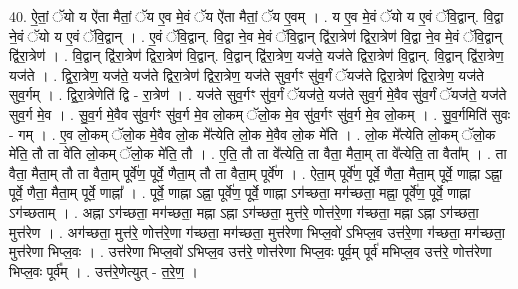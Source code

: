 \documentclass[17pt]{extarticle}
\begin{document}
40. ऐ॒तां॒ ॅयो य ऐ॑ता मैतां॒ ॅय ए॒व मे॒वं ॅय ऐ॑ता मैतां॒ ॅय ए॒वम् । . य ए॒व मे॒वं ॅयो य ए॒वं ॅवि॒द्वान्. वि॒द्वा ने॒वं ॅयो य ए॒वं ॅवि॒द्वान् । . ए॒वं ॅवि॒द्वान्. वि॒द्वा ने॒व मे॒वं ॅवि॒द्वान् द्वि॑रा॒त्रेण॑ द्विरा॒त्रेण॑ वि॒द्वा ने॒व मे॒वं ॅवि॒द्वान् द्वि॑रा॒त्रेण॑ । . वि॒द्वान् द्वि॑रा॒त्रेण॑ द्विरा॒त्रेण॑ वि॒द्वान्. वि॒द्वान् द्वि॑रा॒त्रेण॒ यज॑ते॒ यज॑ते द्विरा॒त्रेण॑ वि॒द्वान्. वि॒द्वान् द्वि॑रा॒त्रेण॒ यज॑ते । . द्वि॒रा॒त्रेण॒ यज॑ते॒ यज॑ते द्विरा॒त्रेण॑ द्विरा॒त्रेण॒ यज॑ते सुव॒र्गꣳ सु॑व॒र्गं ॅयज॑ते द्विरा॒त्रेण॑ द्विरा॒त्रेण॒ यज॑ते सुव॒र्गम् । . द्वि॒रा॒त्रेणेति॑ द्वि - रा॒त्रेण॑ । . यज॑ते सुव॒र्गꣳ सु॑व॒र्गं ॅयज॑ते॒ यज॑ते सुव॒र्ग मे॒वैव सु॑व॒र्गं ॅयज॑ते॒ यज॑ते सुव॒र्ग मे॒व । . सु॒व॒र्ग मे॒वैव सु॑व॒र्गꣳ सु॑व॒र्ग मे॒व लो॒कम् ॅलो॒क मे॒व सु॑व॒र्गꣳ सु॑व॒र्ग मे॒व लो॒कम् । . सु॒व॒र्गमिति॑ सुवः - गम् । . ए॒व लो॒कम् ॅलो॒क मे॒वैव लो॒क मे᳚त्येति लो॒क मे॒वैव लो॒क मे॑ति । . लो॒क मे᳚त्येति लो॒कम् ॅलो॒क मे॑ति॒ तौ ता वे॑ति लो॒कम् ॅलो॒क मे॑ति॒ तौ । . ए॒ति॒ तौ ता वे᳚त्येति॒ ता वैता॒ मैता॒म् ता वे᳚त्येति॒ ता वैता᳚म् । . ता वैता॒ मैता॒म् तौ ता वैता॒म् पूर्वे॑ण॒ पूर्वे॒ णैता॒म् तौ ता वैता॒म् पूर्वे॑ण । . ऐता॒म् पूर्वे॑ण॒ पूर्वे॒ णैता॒ मैता॒म् पूर्वे॒ णाह्ना ऽह्ना॒ पूर्वे॒ णैता॒ मैता॒म् पूर्वे॒ णाह्ना᳚ । . पूर्वे॒ णाह्ना ऽह्ना॒ पूर्वे॑ण॒ पूर्वे॒ णाह्ना ऽग॑च्छता॒ मग॑च्छता॒ मह्ना॒ पूर्वे॑ण॒ पूर्वे॒ णाह्ना ऽग॑च्छताम् । . अह्ना ऽग॑च्छता॒ मग॑च्छता॒ मह्ना ऽह्ना ऽग॑च्छता॒ मुत्त॑रे॒ णोत्त॑रे॒णा ग॑च्छता॒ मह्ना ऽह्ना ऽग॑च्छता॒ मुत्त॑रेण । . अग॑च्छता॒ मुत्त॑रे॒ णोत्त॑रे॒णा ग॑च्छता॒ मग॑च्छता॒ मुत्त॑रेणा भिप्ल॒वो॑ ऽभिप्ल॒व उत्त॑रे॒णा ग॑च्छता॒ मग॑च्छता॒ मुत्त॑रेणा भिप्ल॒वः । . उत्त॑रेणा भिप्ल॒वो॑ ऽभिप्ल॒व उत्त॑रे॒ णोत्त॑रेणा भिप्ल॒वः पूर्व॒म् पूर्व॑ मभिप्ल॒व उत्त॑रे॒ णोत्त॑रेणा भिप्ल॒वः पूर्व᳚म् । . उत्त॑रे॒णेत्युत् - त॒रे॒ण॒ । \newline
\pagebreak
{}
\end{document}

